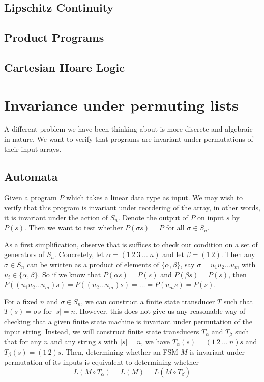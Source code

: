 \documentclass{llncs}
\begin{document}
\subsection{Lipschitz Continuity}

\subsection{Product Programs}

\subsection{Cartesian Hoare Logic}

\section{Invariance under permuting lists}
\label{permlists}

A different problem we have been thinking about is more discrete
and algebraic in nature.
We want to verify that programs are invariant under
permutations of their input arrays.

\subsection{Automata}
Given a program $P$ which takes a linear data type
as input. We may wish to verify that this program
is invariant under reordering of the array,
in other words, it is invariant under the action of $S_n$.
Denote the output of $P$ on input $s$ by $P(s)$.
Then we want to test whether $P(\sigma s) = P$
for all $\sigma \in S_n$.

As a first simplification, observe that is
suffices to check our condition on a set
of generators of $S_n$.
Concretely, let $\alpha = (1\ 2\ 3\ ...\ n)$
and let $\beta = (1\ 2)$.
Then any $\sigma \in S_n$ can be written as
a product of elements of $\{\alpha,\beta\}$,
say $\sigma = u_1 u_2\ldots u_m$ with
$u_i \in \{\alpha,\beta\}$.
So if we know that $P(\alpha s) = P(s)$
and $P(\beta s) = P(s)$, then
$P((u_1 u_2 \ldots u_m)s)
= P((u_2 \ldots u_m)s)
= \ldots = P(u_ms) = P(s) $.

For a fixed $n$ and $\sigma \in S_n$,
we can construct a finite state transducer
$T$ such that $T(s) = \sigma s$ for $|s|=n$.
However, this does not give us any
reasonable way of checking that a given
finite state machine is invariant under permutation
of the input string.
Instead, we will construct finite state
transducers $T_{\alpha}$ and $T_{\beta}$
such that for any $n$ and any string $s$
with $|s|=n$, we have
$T_{\alpha}(s)=(1\ 2\ \ldots\ n) s$ and
$T_{\beta}(s) = (1\ 2) s$.
Then, determining whether an FSM $M$ is
invariant under permutation of its inputs
is equivalent to determining whether
\[
  L(M \circ T_\alpha) = L(M) = L(M \circ T_\beta)
\]
\end{document}
